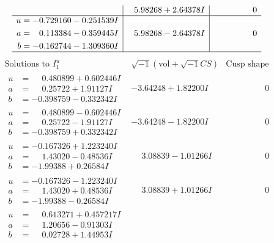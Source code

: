 \documentclass[1p]{elsarticle_modified}
\theoremstyle{definition}
\newcommand{\I}{\sqrt{-1}}
\begin{document}
$$\begin{array}{c|c|c}
 & \phantom{-}5.98268 + 2.64378 I & \phantom{-0.000000 } 0 \\ \hline\begin{aligned}
u &= -0.729160 - 0.251539 I \\
a &= \phantom{-}0.113384 - 0.359445 I \\
b &= -0.162744 - 1.309360 I\end{aligned}
 & \phantom{-}5.98268 - 2.64378 I & \phantom{-0.000000 } 0\\
 \hline 
 \end{array}$$\newpage$$\begin{array}{c|c|c}  
\text{Solutions to }I^u_{1}& \I (\text{vol} + \sqrt{-1}CS) & \text{Cusp shape}\\
 \hline 
\begin{aligned}
u &= \phantom{-}0.480899 + 0.602446 I \\
a &= \phantom{-}0.25722 + 1.91127 I \\
b &= -0.398759 - 0.332342 I\end{aligned}
 & -3.64248 + 1.82200 I & \phantom{-0.000000 } 0 \\ \hline\begin{aligned}
u &= \phantom{-}0.480899 - 0.602446 I \\
a &= \phantom{-}0.25722 - 1.91127 I \\
b &= -0.398759 + 0.332342 I\end{aligned}
 & -3.64248 - 1.82200 I & \phantom{-0.000000 } 0 \\ \hline\begin{aligned}
u &= -0.167326 + 1.223240 I \\
a &= \phantom{-}1.43020 - 0.48536 I \\
b &= -1.99388 + 0.26584 I\end{aligned}
 & \phantom{-}3.08839 - 1.01266 I & \phantom{-0.000000 } 0 \\ \hline\begin{aligned}
u &= -0.167326 - 1.223240 I \\
a &= \phantom{-}1.43020 + 0.48536 I \\
b &= -1.99388 - 0.26584 I\end{aligned}
 & \phantom{-}3.08839 + 1.01266 I & \phantom{-0.000000 } 0 \\ \hline\begin{aligned}
u &= \phantom{-}0.613271 + 0.457217 I \\
a &= \phantom{-}1.20656 - 0.91303 I \\
b &= \phantom{-}0.02728 + 1.44953 I\end{aligned}

\end{array}$$
\end{document}
